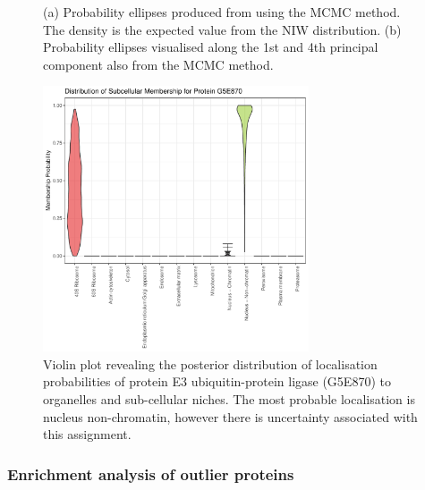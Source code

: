 \documentclass[12pt,english]{article}\usepackage[]{graphicx}\usepackage[]{color}
\newenvironment{knitrout}{}{} %
\begin{document}
\begin{figure}[p]
\begin{subfigure}[t]{0.45\textwidth}
\begin{knitrout}
\end{knitrout}
        \centering
        \caption{}
\end{subfigure}
  \centering
  \caption{(a) Probability ellipses produced from using the MCMC
    method.  The density is the expected value from the NIW
    distribution. (b) Probability ellipses visualised along the 1st
    and 4th principal component also from the MCMC method.}
\label{figure::pcaellipseMCMC}
\end{figure}

\begin{figure}[p]
\centering
\begin{knitrout}
\color{fgcolor}

{\centering \includegraphics[width=0.7\textwidth]{figure/violin-G5E870-1} 

}



\end{knitrout}

\caption{Violin plot revealing the posterior distribution of
  localisation probabilities of protein E3 ubiquitin-protein ligase
  (G5E870) to organelles and sub-cellular niches.  The most probable
  localisation is nucleus non-chromatin, however there is uncertainty
  associated with this assignment.}
\label{fig:G5E870}
\end{figure}


\subsubsection*{Enrichment analysis of outlier proteins}
\end{document}
